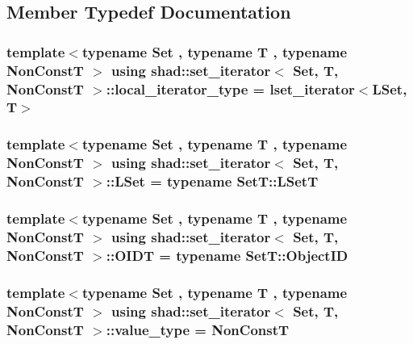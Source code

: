 \subsection{Member Typedef Documentation}
\hypertarget{classshad_1_1set__iterator_a162b1b9d8dfe2e3a656fcdacf0450939}{
\subsubsection[{local\-\_\-iterator\-\_\-type}]{\setlength{\rightskip}{0pt plus 5cm}template$<$typename Set , typename T , typename Non\-Const\-T $>$ using {\bf shad\-::set\-\_\-iterator}$<$ {\bf Set}, T, Non\-Const\-T $>$\-::{\bf local\-\_\-iterator\-\_\-type} =  {\bf lset\-\_\-iterator}$<${\bf L\-Set}, T$>$}}\label{classshad_1_1set__iterator_a162b1b9d8dfe2e3a656fcdacf0450939}
\hypertarget{classshad_1_1set__iterator_a526f8a1656d9a4826cf9d0ec1ab60ac6}{
\subsubsection[{L\-Set}]{\setlength{\rightskip}{0pt plus 5cm}template$<$typename Set , typename T , typename Non\-Const\-T $>$ using {\bf shad\-::set\-\_\-iterator}$<$ {\bf Set}, T, Non\-Const\-T $>$\-::{\bf L\-Set} =  typename Set\-T\-::\-L\-Set\-T}}\label{classshad_1_1set__iterator_a526f8a1656d9a4826cf9d0ec1ab60ac6}
\hypertarget{classshad_1_1set__iterator_a2da49754284fd7ddf591c2df4123b57d}{
\subsubsection[{O\-I\-D\-T}]{\setlength{\rightskip}{0pt plus 5cm}template$<$typename Set , typename T , typename Non\-Const\-T $>$ using {\bf shad\-::set\-\_\-iterator}$<$ {\bf Set}, T, Non\-Const\-T $>$\-::{\bf O\-I\-D\-T} =  typename Set\-T\-::\-Object\-I\-D}}\label{classshad_1_1set__iterator_a2da49754284fd7ddf591c2df4123b57d}
\hypertarget{classshad_1_1set__iterator_a589a0c4bbfc806769293462d96439b0f}{
\subsubsection[{value\-\_\-type}]{\setlength{\rightskip}{0pt plus 5cm}template$<$typename Set , typename T , typename Non\-Const\-T $>$ using {\bf shad\-::set\-\_\-iterator}$<$ {\bf Set}, T, Non\-Const\-T $>$\-::{\bf value\-\_\-type} =  Non\-Const\-T}}\label{classshad_1_1set__iterator_a589a0c4bbfc806769293462d96439b0f}


